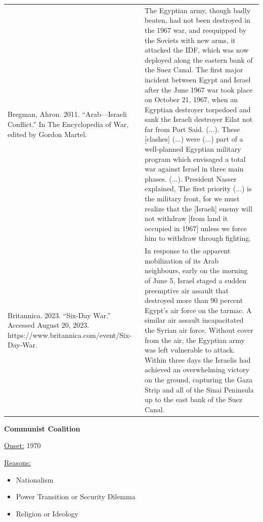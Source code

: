 {\begin{longtable}{p{}p{}}
\\
Bregman, Ahron. 2011. “Arab—Israeli Conflict.” In The Encyclopedia of War, edited by Gordon Martel. & The Egyptian army, though badly beaten, had not been destroyed in the 1967 war, and reequipped by the Soviets with new arms, it attacked the IDF, which was now deployed along the eastern bank of the Suez Canal. The first major incident between Egypt and Israel after the June 1967 war took place on October 21, 1967, when an Egyptian destroyer torpedoed and sank the Israeli destroyer Eilat not far from Port Said. (...).
These [clashes] (...) were (...) part of a well-planned Egyptian military program which envisaged a total war against Israel in three main phases. (...).
President Nasser explained, The first priority (...) is the military front, for we must realize that the [Israeli] enemy will not withdraw [from land it occupied in 1967] unless we force him to withdraw through fighting.
\\
Britannica. 2023. “Six-Day War.” Accessed August 20, 2023. https://www.britannica.com/event/Six-Day-War. & In response to the apparent mobilization of its Arab neighbours, early on the morning of June 5, Israel staged a sudden preemptive air assault that destroyed more than 90 percent Egypt's air force on the tarmac. A similar air assault incapacitated the Syrian air force. Without cover from the air, the Egyptian army was left vulnerable to attack. Within three days the Israelis had achieved an overwhelming victory on the ground, capturing the Gaza Strip and all of the Sinai Peninsula up to the east bank of the Suez Canal.


\\
\end{longtable}}
\clearpage
         \textbf{Communist Coalition} 

          \underline{Onset:} 1970         

\underline{Reasons:}
\begin{itemize}
\item Nationalism
\item Power Transition or Security Dilemma
\item Religion or Ideology
\end{itemize}

